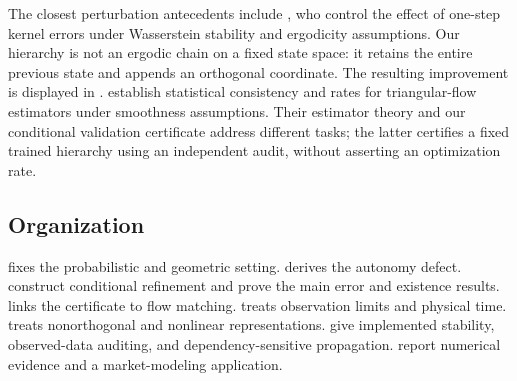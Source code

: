 The closest perturbation antecedents include \citet{rudolf2018}, who control the effect of one-step kernel errors under Wasserstein stability and ergodicity assumptions. Our hierarchy is not an ergodic chain on a fixed state space: it retains the entire previous state and appends an orthogonal coordinate. The resulting improvement is displayed in . \citet{irons2022} establish statistical consistency and rates for triangular-flow estimators under smoothness assumptions. Their estimator theory and our conditional validation certificate address different tasks; the latter certifies a fixed trained hierarchy using an independent audit, without asserting an optimization rate.

\subsection{Organization}
 fixes the probabilistic and geometric setting.  derives the autonomy defect.  construct conditional refinement and prove the main error and existence results.  links the certificate to flow matching.  treats observation limits and physical time.  treats nonorthogonal and nonlinear representations.  give implemented stability, observed-data auditing, and dependency-sensitive propagation.  report numerical evidence and a market-modeling application.
